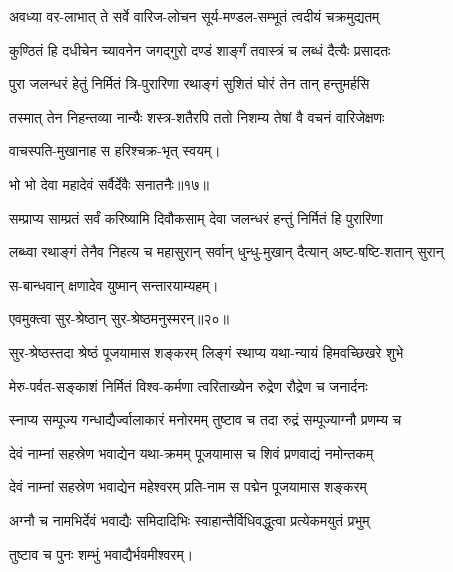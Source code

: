 \twolineshloka
{अवध्या वर-लाभात् ते सर्वे वारिज-लोचन}
{सूर्य-मण्डल-सम्भूतं त्वदीयं चक्रमुद्यतम्} %

\twolineshloka
{कुण्ठितं हि दधीचेन च्यावनेन जगद्गुरो}
{दण्डं शार्ङ्गं तवास्त्रं च लब्धं दैत्यैः प्रसादतः} %

\twolineshloka
{पुरा जलन्धरं हेतुं निर्मितं त्रि-पुरारिणा}
{रथाङ्गं सुशितं घोरं तेन तान् हन्तुमर्हसि} %

\twolineshloka
{तस्मात् तेन निहन्तव्या नान्यैः शस्त्र-शतैरपि}
{ततो निशम्य तेषां वै वचनं वारिजेक्षणः} %


{वाचस्पति-मुखानाह स हरिश्चक्र-भृत् स्वयम्।}

{भो भो देवा महादेवं सर्वैर्देवैः सनातनैः॥१७॥} %
\addtocounter{shlokacount}{1}

\twolineshloka
{सम्प्राप्य साम्प्रतं सर्वं करिष्यामि दिवौकसाम्}
{देवा जलन्धरं हन्तुं निर्मितं हि पुरारिणा} %

\twolineshloka
{लब्ध्वा रथाङ्गं तेनैव निहत्य च महासुरान्}
{सर्वान् धुन्धु-मुखान् दैत्यान् अष्ट-षष्टि-शतान् सुरान्} %

{स-बान्धवान् क्षणादेव युष्मान् सन्तारयाम्यहम्।}


{एवमुक्त्वा सुर-श्रेष्ठान् सुर-श्रेष्ठमनुस्मरन्॥२०॥} %

\addtocounter{shlokacount}{1}

\twolineshloka
{सुर-श्रेष्ठस्तदा श्रेष्ठं पूजयामास शङ्करम्}
{लिङ्गं स्थाप्य यथा-न्यायं हिमवच्छिखरे शुभे} %

\twolineshloka
{मेरु-पर्वत-सङ्काशं निर्मितं विश्व-कर्मणा}
{त्वरिताख्येन रुद्रेण रौद्रेण च जनार्दनः} %

\twolineshloka
{स्नाप्य सम्पूज्य गन्धाद्यैर्ज्वालाकारं मनोरमम्}
{तुष्टाव च तदा रुद्रं सम्पूज्याग्नौ प्रणम्य च} %

\twolineshloka
{देवं नाम्नां सहस्रेण भवाद्येन यथा-क्रमम्}
{पूजयामास च शिवं प्रणवाद्यं नमोन्तकम्} %

\twolineshloka
{देवं नाम्नां सहस्रेण भवाद्येन महेश्वरम्}
{प्रति-नाम स पद्मेन पूजयामास शङ्करम्} %

\twolineshloka
{अग्नौ च नामभिर्देवं भवाद्यैः समिदादिभिः}
{स्वाहान्तैर्विधिवद्धुत्वा प्रत्येकमयुतं प्रभुम्} %

तुष्टाव च पुनः शम्भुं भवाद्यैर्भवमीश्वरम्।




\resetShloka

